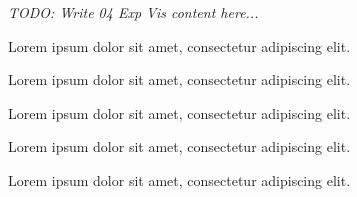 \textit{TODO: Write 04 Exp Vis content here...}
\par Lorem ipsum dolor sit amet, consectetur adipiscing elit. \par Lorem ipsum dolor sit amet, consectetur adipiscing elit. \par Lorem ipsum dolor sit amet, consectetur adipiscing elit. \par Lorem ipsum dolor sit amet, consectetur adipiscing elit. \par Lorem ipsum dolor sit amet, consectetur adipiscing elit. 
